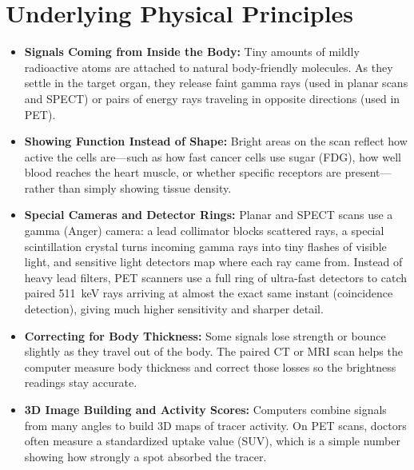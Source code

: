 \section{Underlying Physical Principles}
\begin{itemize}
  \item \textbf{Signals Coming from Inside the Body:} Tiny amounts of mildly radioactive atoms are attached to natural body-friendly molecules. As they settle in the target organ, they release faint gamma rays (used in planar scans and SPECT) or pairs of energy rays traveling in opposite directions (used in PET).
  \item \textbf{Showing Function Instead of Shape:} Bright areas on the scan reflect how active the cells are---such as how fast cancer cells use sugar (FDG), how well blood reaches the heart muscle, or whether specific receptors are present---rather than simply showing tissue density.
  \item \textbf{Special Cameras and Detector Rings:} Planar and SPECT scans use a gamma (Anger) camera: a lead collimator blocks scattered rays, a special scintillation crystal turns incoming gamma rays into tiny flashes of visible light, and sensitive light detectors map where each ray came from. Instead of heavy lead filters, PET scanners use a full ring of ultra-fast detectors to catch paired 511~keV rays arriving at almost the exact same instant (coincidence detection), giving much higher sensitivity and sharper detail.
  \item \textbf{Correcting for Body Thickness:} Some signals lose strength or bounce slightly as they travel out of the body. The paired CT or MRI scan helps the computer measure body thickness and correct those losses so the brightness readings stay accurate.
  \item \textbf{3D Image Building and Activity Scores:} Computers combine signals from many angles to build 3D maps of tracer activity. On PET scans, doctors often measure a standardized uptake value (SUV), which is a simple number showing how strongly a spot absorbed the tracer.
\end{itemize}

